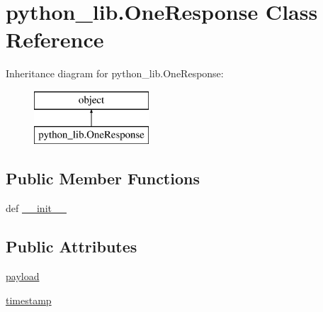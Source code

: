 \hypertarget{classpython__lib_1_1_one_response}{\section{python\-\_\-lib.\-One\-Response Class Reference}
\label{classpython__lib_1_1_one_response}
}
Inheritance diagram for python\-\_\-lib.\-One\-Response\-:\begin{figure}[H]
\begin{center}
\leavevmode
\includegraphics[height=2.000000cm]{classpython__lib_1_1_one_response}
\end{center}
\end{figure}
\subsection*{Public Member Functions}
\begin{DoxyCompactItemize}
\item 
def \hyperlink{classpython__lib_1_1_one_response_aebfa88bda9e981a4bc1cb3423776c5b4}{\-\_\-\-\_\-init\-\_\-\-\_\-}
\end{DoxyCompactItemize}
\subsection*{Public Attributes}
\begin{DoxyCompactItemize}
\item 
\hyperlink{classpython__lib_1_1_one_response_a33490413e76a4b92c0d947875c553cf0}{payload}
\item 
\hyperlink{classpython__lib_1_1_one_response_a1c5706bab79abb280fb0a46e3ea65d32}{timestamp}
\end{DoxyCompactItemize}


